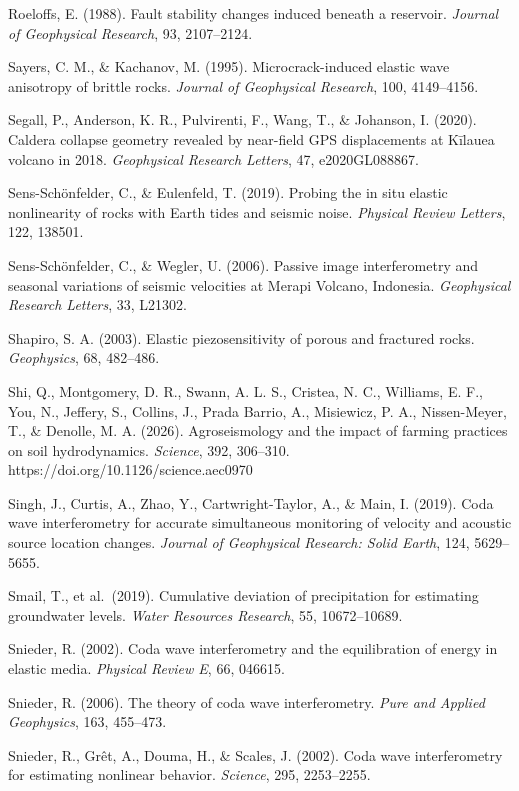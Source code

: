 \documentclass[draft]{agujournal2019}
\begin{document}
Roeloffs, E. (1988). Fault stability changes induced beneath a
reservoir. \emph{Journal of Geophysical Research}, 93, 2107--2124.

Sayers, C. M., \& Kachanov, M. (1995). Microcrack-induced elastic wave
anisotropy of brittle rocks. \emph{Journal of Geophysical Research},
100, 4149--4156.

Segall, P., Anderson, K. R., Pulvirenti, F., Wang, T., \& Johanson, I.
(2020). Caldera collapse geometry revealed by near-field GPS
displacements at Kīlauea volcano in 2018. \emph{Geophysical Research
Letters}, 47, e2020GL088867.

Sens-Schönfelder, C., \& Eulenfeld, T. (2019). Probing the in situ
elastic nonlinearity of rocks with Earth tides and seismic noise.
\emph{Physical Review Letters}, 122, 138501.

Sens-Schönfelder, C., \& Wegler, U. (2006). Passive image interferometry
and seasonal variations of seismic velocities at Merapi Volcano,
Indonesia. \emph{Geophysical Research Letters}, 33, L21302.

Shapiro, S. A. (2003). Elastic piezosensitivity of porous and fractured
rocks. \emph{Geophysics}, 68, 482--486.

Shi, Q., Montgomery, D. R., Swann, A. L. S., Cristea, N. C., Williams,
E. F., You, N., Jeffery, S., Collins, J., Prada Barrio, A., Misiewicz,
P. A., Nissen-Meyer, T., \& Denolle, M. A. (2026). Agroseismology and
the impact of farming practices on soil hydrodynamics. \emph{Science},
392, 306--310. https://doi.org/10.1126/science.aec0970

Singh, J., Curtis, A., Zhao, Y., Cartwright-Taylor, A., \& Main, I.
(2019). Coda wave interferometry for accurate simultaneous monitoring of
velocity and acoustic source location changes. \emph{Journal of
Geophysical Research: Solid Earth}, 124, 5629--5655.

Smail, T., et al.~(2019). Cumulative deviation of precipitation for
estimating groundwater levels. \emph{Water Resources Research}, 55,
10672--10689.

Snieder, R. (2002). Coda wave interferometry and the equilibration of
energy in elastic media. \emph{Physical Review E}, 66, 046615.

Snieder, R. (2006). The theory of coda wave interferometry. \emph{Pure
and Applied Geophysics}, 163, 455--473.

Snieder, R., Grêt, A., Douma, H., \& Scales, J. (2002). Coda wave
interferometry for estimating nonlinear behavior. \emph{Science}, 295,
2253--2255.
\end{document}
